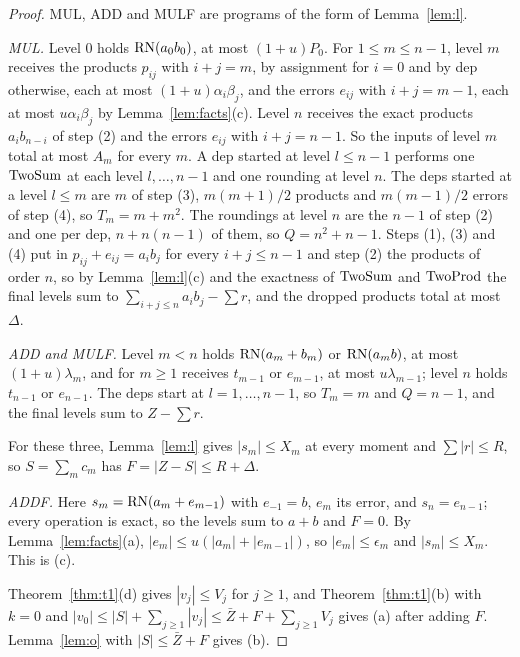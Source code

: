 \begin{proof}
MUL, ADD and MULF are programs of the form of Lemma~\ref{lem:l}.

\emph{MUL.} Level 0 holds $\mathrm{RN}(a_0b_0)$, at most $(1+u)P_0$. For $1 \le m \le n-1$, level $m$ receives the products
$p_{ij}$ with $i + j = m$, by assignment for $i = 0$ and by dep otherwise, each at most $(1+u)\alpha_i\beta_j$, and the
errors $e_{ij}$ with $i + j = m - 1$, each at most $u\alpha_i\beta_j$ by Lemma~\ref{lem:facts}(c). Level $n$ receives
the exact products $a_ib_{n-i}$ of step (2) and the errors $e_{ij}$ with $i + j = n-1$. So the inputs of level $m$
total at most $A_m$ for every $m$. A dep started at level $l \le n-1$ performs one $\mathrm{TwoSum}$ at each level $l, \dots,
n-1$ and one rounding at level $n$. The deps started at a level $l \le m$ are $m$ of step (3), $m(m+1)/2$ products and
$m(m-1)/2$ errors of step (4), so $T_m = m + m^2$. The roundings at level $n$ are the $n-1$ of step (2) and one per
dep, $n + n(n-1)$ of them, so $Q = n^2 + n - 1$. Steps (1), (3) and (4) put in $p_{ij} + e_{ij} = a_ib_j$ for every $i
+ j \le n-1$ and step (2) the products of order $n$, so by Lemma~\ref{lem:l}(c) and the exactness of $\mathrm{TwoSum}$ and
$\mathrm{TwoProd}$ the final levels sum to $\sum_{i+j \le n} a_ib_j - \sum r$, and the dropped products total at most $\Delta$.

\emph{ADD and MULF.} Level $m < n$ holds $\mathrm{RN}(a_m + b_m)$ or $\mathrm{RN}(a_m b)$, at most $(1+u)\lambda_m$, and for $m \ge 1$
receives $t_{m-1}$ or $e_{m-1}$, at most $u\lambda_{m-1}$; level $n$ holds $t_{n-1}$ or $e_{n-1}$. The deps start at $l
= 1, \dots, n-1$, so $T_m = m$ and $Q = n-1$, and the final levels sum to $Z - \sum r$.

For these three, Lemma~\ref{lem:l} gives $|s_m| \le X_m$ at every moment and $\sum|r| \le R$, so $S = \sum_m c_m$ has
$F = |Z - S| \le R + \Delta$.

\emph{ADDF.} Here $s_m = \mathrm{RN}(a_m + e_{m-1})$ with $e_{-1} = b$, $e_m$ its error, and $s_n = e_{n-1}$; every operation
is exact, so the levels sum to $a + b$ and $F = 0$. By Lemma~\ref{lem:facts}(a), $|e_m| \le u(|a_m| + |e_{m-1}|)$, so
$|e_m| \le \epsilon_m$ and $|s_m| \le X_m$. This is (c).

Theorem~\ref{thm:t1}(d) gives $|v_j| \le V_j$ for $j \ge 1$, and Theorem~\ref{thm:t1}(b) with $k = 0$ and $|v_0| \le |S|
+ \sum_{j \ge 1}|v_j| \le \bar Z + F + \sum_{j \ge 1}V_j$ gives (a) after adding $F$. Lemma~\ref{lem:o} with $|S| \le
\bar Z + F$ gives (b).
\end{proof}

